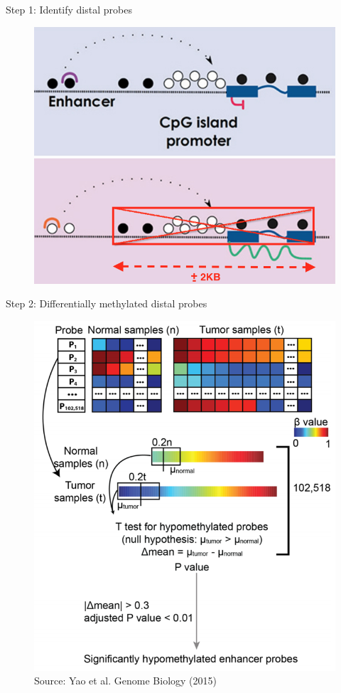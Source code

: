 \documentclass[slidestop,compress,11pt,xcolor=dvipsnames]{beamer}
\begin{document}
\begin{frame}{Step 1: Identify distal probes}
 \begin{figure}
  \centering
  \includegraphics[width=0.7\linewidth]{step1.png}
 \end{figure}
\end{frame}


\begin{frame}{Step 2: Differentially methylated distal probes}
 \vspace*{-0.4cm}
 \begin{figure}
  \centering
  \includegraphics[width=0.6\linewidth]{ELMER/diffmeth.png}{\tiny{\\\vspace*{-0.2cm}Source: Yao et al. Genome Biology (2015)}}
 \end{figure}
\end{frame}
\end{document}
